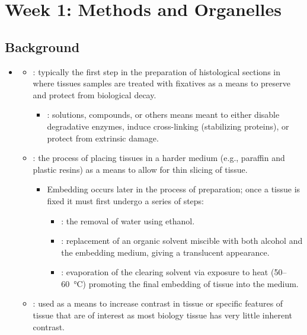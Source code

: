 \chapter{Week 1: Methods and Organelles}\label{Week 1: Methods and Organelles}

\section{Background}\label{Background}
\begin{itemize}
  \item {}
    \begin{itemize}
      \item {}: typically the first step in the preparation of histological sections in where tissues samples are treated with fixatives as a means to preserve and protect from biological decay.
        \begin{itemize}
          \item {}: solutions, compounds, or others means meant to either disable degradative enzymes, induce cross-linking (stabilizing proteins), or protect from extrinsic damage.
        \end{itemize}
      \item {}: the process of placing tissues in a harder medium (e.g., paraffin and plastic resins) as a means to allow for thin slicing of tissue.
        \begin{itemize}
          \item Embedding occurs later in the process of preparation; once a tissue is fixed it must first undergo a series of steps:
          \begin{itemize}
            \item {}: the removal of water using ethanol.
            \item {}: replacement of an organic solvent miscible with both alcohol and the embedding medium, giving a translucent appearance.
            \item {}: evaporation of the clearing solvent via exposure to heat (50--\SI{60}{\celsius}) promoting the final embedding of tissue into the medium.
          \end{itemize}
        \end{itemize}
      \item {}: used as a means to increase contrast in tissue or specific features of tissue that are of interest as most biology tissue has very little inherent contrast.

\end{itemize}
\end{itemize}
